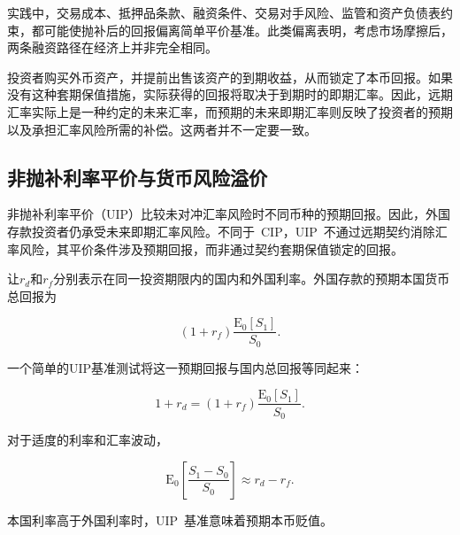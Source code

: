 实践中，交易成本、抵押品条款、融资条件、交易对手风险、监管和资产负债表约束，都可能使抛补后的回报偏离简单平价基准。此类偏离表明，考虑市场摩擦后，两条融资路径在经济上并非完全相同。

\begin{tcolorbox}[
  enhanced,
  breakable,
  colback=white,
  colframe=FinanceBlue,
  boxrule=0.7pt,
  sharp corners,
  borderline west={2.2pt}{0pt}{FinanceBlue},
  title=\textbf{财务展望：远期利率并非预测结果},
  coltitle=white,
  colbacktitle=FinanceBlue,
  fonttitle=\bfseries,
  before skip=1.2em,
  after skip=1.2em
]

投资者购买外币资产，并提前出售该资产的到期收益，从而锁定了本币回报。如果没有这种套期保值措施，实际获得的回报将取决于到期时的即期汇率。因此，远期汇率实际上是一种约定的未来汇率，而预期的未来即期汇率则反映了投资者的预期以及承担汇率风险所需的补偿。这两者并不一定要一致。

\end{tcolorbox}


\subsection{非抛补利率平价与货币风险溢价}

非抛补利率平价（UIP）比较未对冲汇率风险时不同币种的预期回报。因此，外国存款投资者仍承受未来即期汇率风险。不同于~CIP，UIP~不通过远期契约消除汇率风险，其平价条件涉及预期回报，而非通过契约套期保值锁定的回报。

让$r_d$和$r_f$分别表示在同一投资期限内的国内和外国利率。外国存款的预期本国货币总回报为

\begin{equation*}
(1+r_f)\frac{\mathrm{E}_0[S_1]}{S_0}.
\label{eq:ch10-uip-foreign-return}
\end{equation*}

一个简单的UIP基准测试将这一预期回报与国内总回报等同起来：

\begin{equation}
1+r_d
=
(1+r_f)\frac{\mathrm{E}_0[S_1]}{S_0}.
\label{eq:ch10-uip-exact}
\end{equation}

对于适度的利率和汇率波动，

\begin{equation}
\mathrm{E}_0\left[\frac{S_1-S_0}{S_0}\right]
\approx
r_d-r_f.
\label{eq:ch10-uip-approx}
\end{equation}

本国利率高于外国利率时，UIP~基准意味着预期本币贬值。 

